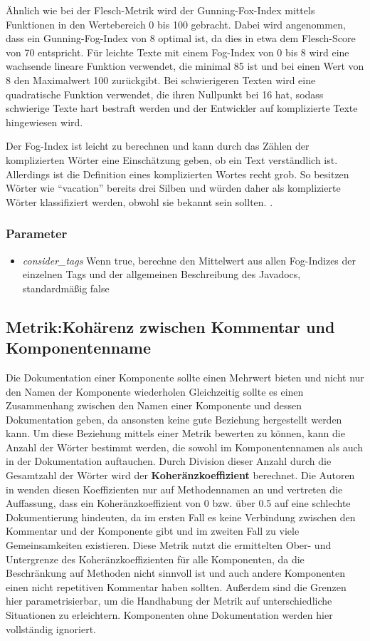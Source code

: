 Ähnlich wie bei der Flesch-Metrik wird der Gunning-Fox-Index mittels Funktionen in den Wertebereich 0 bis 100 gebracht. Dabei wird angenommen, dass ein Gunning-Fog-Index von 8 optimal ist, da dies in etwa dem Flesch-Score von 70 entspricht. Für leichte Texte mit einem Fog-Index von 0 bis 8 wird eine wachsende lineare Funktion verwendet, die minimal 85 ist und bei einen Wert von 8 den Maximalwert 100 zurückgibt. Bei schwierigeren Texten  wird eine quadratische Funktion verwendet, die ihren Nullpunkt bei 16 hat, sodass schwierige Texte hart bestraft werden und der Entwickler auf komplizierte Texte hingewiesen wird.

Der Fog-Index ist leicht zu berechnen und kann durch das Zählen der komplizierten Wörter eine Einschätzung geben, ob ein Text verständlich ist. Allerdings ist die Definition eines komplizierten Wortes recht grob. So besitzen Wörter wie \enquote{vacation} bereits drei Silben und würden daher als komplizierte Wörter klassifiziert werden, obwohl sie  bekannt sein sollten. \cite[S. 10]{bogert1985defense}.

\subsubsection{Parameter}
\begin{itemize}
    \item \textit{consider\_tags} Wenn true, berechne den Mittelwert aus allen Fog-Indizes der einzelnen Tags und der allgemeinen Beschreibung des Javadocs, standardmäßig false
\end{itemize}
\subsection{Metrik:Kohärenz zwischen Kommentar und Komponentenname}\label{chapter:metrics_coherence}
Die Dokumentation einer Komponente sollte einen Mehrwert bieten und nicht nur den Namen der Komponente wiederholen  Gleichzeitig sollte es einen Zusammenhang zwischen den Namen einer Komponente und dessen Dokumentation geben, da ansonsten keine gute Beziehung hergestellt werden kann\cite[S. 86-87]{Qualityanalysisofsourcecodecomments}. Um diese Beziehung mittels einer Metrik bewerten zu können, kann die Anzahl der Wörter bestimmt werden, die sowohl im Komponentennamen als auch in der Dokumentation auftauchen. Durch Division dieser Anzahl durch die Gesamtzahl der Wörter wird der \textbf{Koheränzkoeffizient} berechnet. Die Autoren in \cite[S. 86-87]{Qualityanalysisofsourcecodecomments} wenden diesen Koeffizienten nur auf Methodennamen an und vertreten die Auffassung, dass ein Koheränzkoeffizient von 0 bzw. über 0.5 auf eine schlechte Dokumentierung hindeuten, da im ersten Fall es keine Verbindung zwischen den Kommentar und der Komponente gibt und im zweiten Fall zu viele Gemeinsamkeiten existieren. Diese Metrik nutzt die ermittelten Ober- und Untergrenze des Koheränzkoeffizienten für alle Komponenten, da die Beschränkung auf Methoden nicht sinnvoll ist und auch andere Komponenten einen nicht repetitiven Kommentar haben sollten. Außerdem sind die Grenzen hier parametrisierbar, um die Handhabung der Metrik auf unterschiedliche Situationen zu erleichtern. Komponenten ohne Dokumentation werden hier vollständig ignoriert. 

